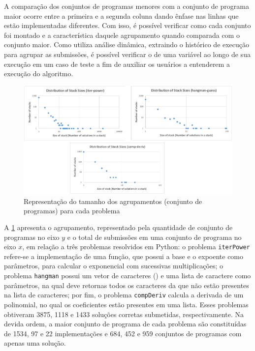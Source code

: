 		A comparação dos conjuntos de programas menores com a conjunto de programa maior
		ocorre entre a primeira e a segunda coluna dando ênfase nas linhas que estão
		implementadas diferentes. Com isso, é possível verificar como cada conjunto
		foi montado e a característica daquele agrupamento quando comparada com o
		conjunto maior. Como utiliza análise dinâmica, extraindo o histórico de execução
		para agrupar as submissões, é possível verificar o  de uma
		variável ao longo de sua execução em um caso de teste a fim de auxiliar os
		usuários a entenderem a execução do algoritmo.
		
		\begin{figure}[h]
			\centering
			\includegraphics[width=1\linewidth]{imagem/OverCodeDistri}
			\caption[Representação do tamanho dos agrupamentos (conjunto de programas) para cada problema]
			{Representação do tamanho dos agrupamentos (conjunto de programas) para cada problema
				\cite{Glassman:2015}}
			\label{fig:OverCodeDistri}
		\end{figure}

		A \cref{fig:OverCodeDistri} apresenta o agrupamento, representado pela quantidade de
		conjunto de programas no eixo $y$ e o total de submissões em uma conjunto de programa no eixo $x$,  em relação a
		três problemas resolvidos em Python: o problema \texttt{iterPower} refere-se a
		implementação de uma função, que possui a base e o expoente como parâmetros, para
		calcular o exponencial com sucessivas multiplicações; o problema \texttt{hangman}
		possui um vetor de caracteres () e uma lista de caractere como
		parâmetros, na qual deve retornas todos os caracteres da  que não
		estão presentes na lista de caracteres; por fim, o problema \texttt{compDeriv}
		calcula a derivada de um polinomial, no qual os coeficientes estão presentes em
		uma lista. Esses problemas obtiveram 3875, 1118 e 1433 soluções corretas submetidas,
		respectivamente. Na devida ordem, a maior conjunto de programa de cada problema são constituídas
		de 1534, 97 e 22 implementações e 684, 452 e 959 conjuntos de programas com apenas uma solução.


